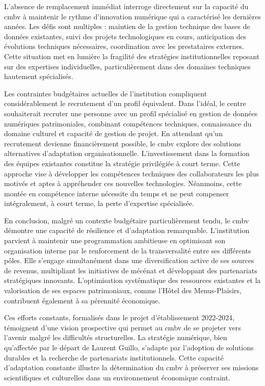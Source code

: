 L'absence de remplacement immédiat interroge directement sur la capacité du \gls{cmbv} à maintenir le rythme d'innovation numérique qui a caractérisé les dernières années. Les défis sont multiples : maintien de la gestion technique des bases de données existantes, suivi des projets technologiques en cours, anticipation des évolutions techniques nécessaires, coordination avec les prestataires externes. Cette situation met en lumière la fragilité des stratégies institutionnelles reposant sur des expertises individuelles, particulièrement dans des domaines techniques hautement spécialisés.

Les contraintes budgétaires actuelles de l'institution compliquent considérablement le recrutement d'un profil équivalent. Dans l'idéal, le centre souhaiterait recruter une personne avec un profil spécialisé en gestion de données numériques patrimoniales, combinant compétences techniques, connaissance du domaine culturel et capacité de gestion de projet. En attendant qu'un recrutement devienne financièrement possible, le \gls{cmbv} explore des solutions alternatives d'adaptation organisationnelle. L'investissement dans la formation des équipes existantes constitue la stratégie privilégiée à court terme. Cette approche vise à développer les compétences techniques des collaborateurs les plus motivés et aptes à appréhender ces nouvelles technologies. Néanmoins, cette montée en compétence interne nécessite du temps et ne peut compenser intégralement, à court terme, la perte d'expertise spécialisée.

En conclusion, malgré un contexte budgétaire particulièrement tendu, le \gls{cmbv} démontre une capacité de résilience et d'adaptation remarquable. L'institution parvient à maintenir une programmation ambitieuse en optimisant son organisation interne par le renforcement de la transversalité entre ses différents pôles. Elle s'engage simultanément dans une diversification active de ses sources de revenus, multipliant les initiatives de mécénat et développant des partenariats stratégiques innovants. L'optimisation systématique des ressources existantes et la valorisation de ses espaces patrimoniaux, comme l'Hôtel des Menus-Plaisirs, contribuent également à sa pérennité économique.

Ces efforts constants, formalisés dans le projet d'établissement 2022-2024, témoignent d'une vision prospective qui permet au \gls{cmbv} de se projeter vers l'avenir malgré les difficultés structurelles. La stratégie numérique, bien qu'affectée par le départ de Laurent Guillo, s'adapte par l'adoption de solutions durables et la recherche de partenariats institutionnels. Cette capacité d'adaptation constante illustre la détermination du \gls{cmbv} à préserver ses missions scientifiques et culturelles dans un environnement économique contraint.

